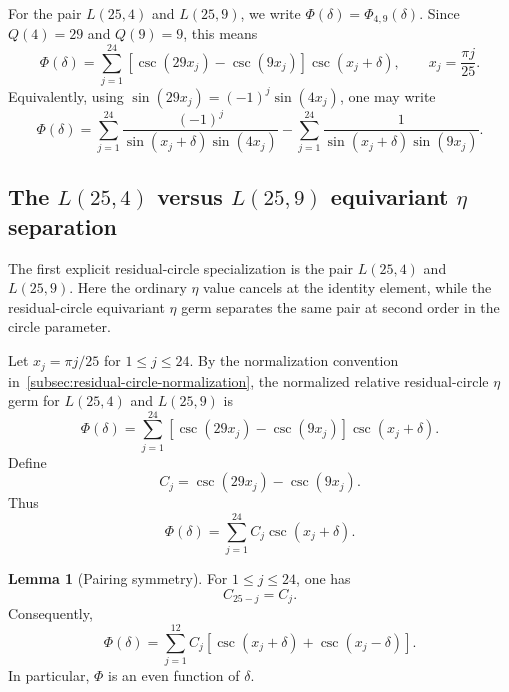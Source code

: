 \documentclass{article}
\theoremstyle{definition}
\newtheorem{lemma}[theorem]{Lemma}
\numberwithin{equation}{section}
\begin{document}
For the pair $L(25,4)$ and $L(25,9)$, we write $\Phi(\delta)=\Phi_{4,9}(\delta)$.  Since $Q(4)=29$ and $Q(9)=9$, this means
\begin{equation}
\Phi(\delta)
=
\sum_{j=1}^{24}
\left[
\csc(29x_j)-\csc(9x_j)
\right]\csc(x_j+\delta),
\qquad
x_j=\frac{\pi j}{25}.
\end{equation}
Equivalently, using $\sin(29x_j)=(-1)^j\sin(4x_j)$, one may write
\begin{equation}
\Phi(\delta)
=
\sum_{j=1}^{24}
\frac{(-1)^j}{\sin(x_j+\delta)\sin(4x_j)}
-
\sum_{j=1}^{24}
\frac{1}{\sin(x_j+\delta)\sin(9x_j)}.
\end{equation}

\subsection{The $L(25,4)$ versus $L(25,9)$ equivariant $\eta$ separation}
\label{subsec:L254-L259-equivariant-eta}

The first explicit residual-circle specialization is the pair $L(25,4)$ and $L(25,9)$.  Here the ordinary $\eta$ value cancels at the identity element, while the residual-circle equivariant $\eta$ germ separates the same pair at second order in the circle parameter.

Let $x_j=\pi j/25$ for $1\leq j\leq24$.  By the normalization convention in~\autoref{subsec:residual-circle-normalization}, the normalized relative residual-circle $\eta$ germ for $L(25,4)$ and $L(25,9)$ is
\begin{equation}
\Phi(\delta)
=
\sum_{j=1}^{24}
\left[
\csc(29x_j)-\csc(9x_j)
\right]\csc(x_j+\delta).
\end{equation}
Define
\begin{equation}
C_j=
\csc(29x_j)-\csc(9x_j).
\end{equation}
Thus
\begin{equation}
\Phi(\delta)
=
\sum_{j=1}^{24}C_j\csc(x_j+\delta).
\end{equation}

\begin{lemma}[Pairing symmetry]
For $1\leq j\leq24$, one has
\begin{equation}
C_{25-j}=C_j.
\end{equation}
Consequently,
\begin{equation}
\Phi(\delta)
=
\sum_{j=1}^{12}
C_j
\left[
\csc(x_j+\delta)+\csc(x_j-\delta)
\right].
\end{equation}
In particular, $\Phi$ is an even function of $\delta$.
\end{lemma}
\end{document}
